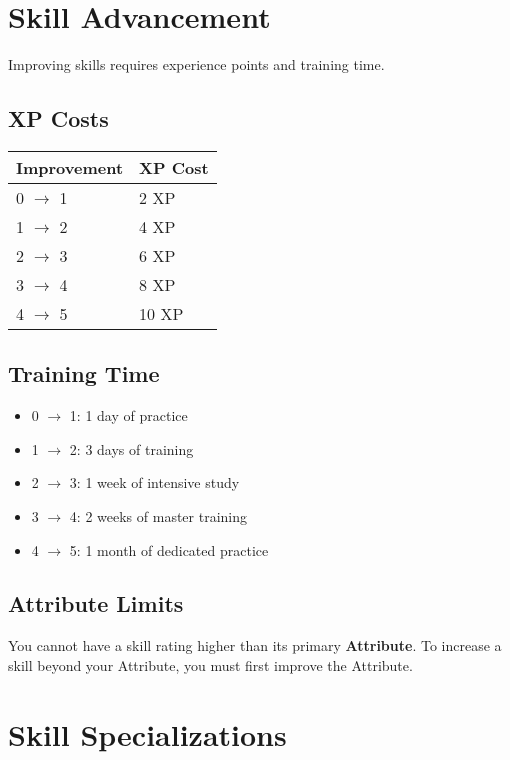 \section{Skill Advancement}

Improving skills requires experience points and training time.

\subsection*{XP Costs}
\begin{center}
\small
\begin{tabular}{ll}
\toprule
\textbf{Improvement} & \textbf{XP Cost} \\
\midrule
0 $\rightarrow$ 1 & 2 XP \\
1 $\rightarrow$ 2 & 4 XP \\
2 $\rightarrow$ 3 & 6 XP \\
3 $\rightarrow$ 4 & 8 XP \\
4 $\rightarrow$ 5 & 10 XP \\
\bottomrule
\end{tabular}
\end{center}

\subsection*{Training Time}
\begin{itemize}
\item 0 $\rightarrow$ 1: 1 day of practice
\item 1 $\rightarrow$ 2: 3 days of training
\item 2 $\rightarrow$ 3: 1 week of intensive study
\item 3 $\rightarrow$ 4: 2 weeks of master training
\item 4 $\rightarrow$ 5: 1 month of dedicated practice
\end{itemize}

\subsection*{Attribute Limits}
You cannot have a skill rating higher than its primary \textbf{Attribute}. To increase a skill beyond your Attribute, you must first improve the Attribute.

\section{Skill Specializations}

